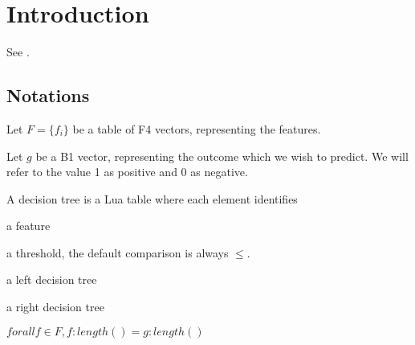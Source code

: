 
\section{Introduction}

See \cite{Hastie2009}.

\subsection{Notations}

\bi
\item Let \(F = \{f_i\}\) be a table of F4 vectors, representing the features.
\item Let \(g\) be a B1 vector, representing the outcome which we wish to
predict. We will refer to the value 1 as positive and 0 as negative.
\ei

A decision tree is a Lua table where each element identifies
\be
\item a feature
\item a threshold, the default comparison is always \(\leq\).
\item a left decision tree
\item a right decision tree
\ee

\begin{invariant}
\(forall f \in F, f:length() = g:length()\)
\end{invariant}


